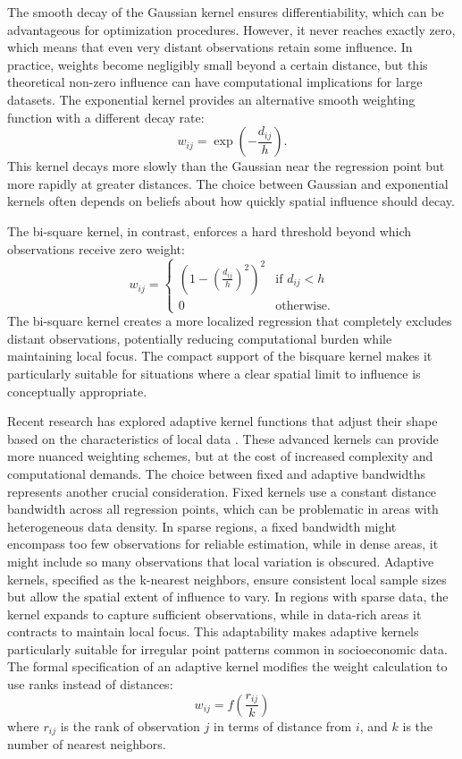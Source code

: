 \documentclass[smallextended, natbib]{svjour3}       %
\begin{document}
The smooth decay of the Gaussian kernel ensures differentiability, which can be advantageous for optimization procedures. 
However, it never reaches exactly zero, which means that even very distant observations retain some influence. 
In practice, weights become negligibly small beyond a certain distance, but this theoretical non-zero influence can have computational implications for large datasets.
The exponential kernel provides an alternative smooth weighting function with a different decay rate:
$$w_{ij} = \exp\left(-\frac{d_{ij}}{h}\right).$$
This kernel decays more slowly than the Gaussian near the regression point but more rapidly at greater distances. 
The choice between Gaussian and exponential kernels often depends on beliefs about how quickly spatial influence should decay.

The bi-square kernel, in contrast, enforces a hard threshold beyond which observations receive zero weight:
$$w_{ij} = \begin{cases}
\left(1 - \left(\frac{d_{ij}}{h}\right)^2\right)^2 & \text{if } d_{ij} < h \\
0 & \text{otherwise.}
\end{cases}$$
The bi-square kernel creates a more localized regression that completely excludes distant observations, potentially reducing computational burden while maintaining local focus. 
The compact support of the bisquare kernel makes it particularly suitable for situations where a clear spatial limit to influence is conceptually appropriate.

Recent research has explored adaptive kernel functions that adjust their shape based on the characteristics of local data \citep{wolf2018single}. 
These advanced kernels can provide more nuanced weighting schemes, but at the cost of increased complexity and computational demands.
The choice between fixed and adaptive bandwidths represents another crucial consideration. 
Fixed kernels use a constant distance bandwidth across all regression points, which can be problematic in areas with heterogeneous data density. 
In sparse regions, a fixed bandwidth might encompass too few observations for reliable estimation, while in dense areas, it might include so many observations that local variation is obscured.
Adaptive kernels, specified as the k-nearest neighbors, ensure consistent local sample sizes but allow the spatial extent of influence to vary. 
In regions with sparse data, the kernel expands to capture sufficient observations, while in data-rich areas it contracts to maintain local focus. 
This adaptability makes adaptive kernels particularly suitable for irregular point patterns common in socioeconomic data. 
The formal specification of an adaptive kernel modifies the weight calculation to use ranks instead of distances:
$$w_{ij} = f\left(\frac{r_{ij}}{k}\right)$$
where $r_{ij}$ is the rank of observation $j$ in terms of distance from $i$, and $k$ is the number of nearest neighbors.
\end{document}
